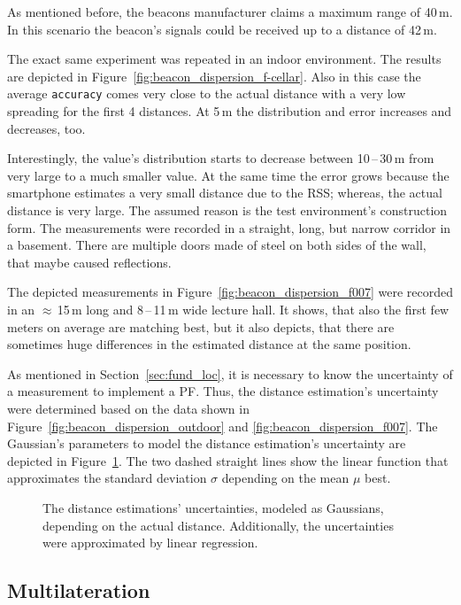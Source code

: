 As mentioned before, the beacons manufacturer claims a maximum range of 40\,m. In this scenario the beacon's signals could be received up to a distance of 42\,m.

The exact same experiment was repeated in an indoor environment. The results are depicted in Figure~\ref{fig:beacon_dispersion_f-cellar}. Also in this case the average \texttt{accuracy} comes very close to the actual distance with a very low spreading for the first 4 distances. At 5\,m the distribution and error increases and decreases, too.

Interestingly, the value's distribution starts to decrease between 10\,--\,30\,m from very large to a much smaller value. At the same time the error grows because the smartphone estimates a very small distance due to the \ac{RSS}; whereas, the actual distance is very large. The assumed reason is the test environment's construction form. The measurements were recorded in a straight, long, but narrow corridor in a basement. There are multiple doors made of steel on both sides of the wall, that maybe caused reflections.

The depicted measurements in Figure~\ref{fig:beacon_dispersion_f007} were recorded in an $\approx$\,15\,m long and 8\,--\,11\,m wide lecture hall. It shows, that also the first few meters on average are matching best, but it also depicts, that there are sometimes huge differences in the estimated distance at the same position.

As mentioned in Section~\ref{sec:fund_loc}, it is necessary to know the uncertainty of a measurement to implement a \acl{PF}. Thus, the distance estimation's uncertainty were determined based on the data shown in Figure~\ref{fig:beacon_dispersion_outdoor} and \ref{fig:beacon_dispersion_f007}. The Gaussian's parameters to model the distance estimation's uncertainty are depicted in Figure~\ref{fig:beacon_eval_ndf}. The two dashed straight lines show the linear function that approximates the standard deviation $\sigma$ depending on the mean $\mu$ best.

\begin{figure}
	
	\caption{The distance estimations' uncertainties, modeled as Gaussians, depending on the actual distance. Additionally, the uncertainties were approximated by linear regression.}
	\label{fig:beacon_eval_ndf}
\end{figure}


\subsection{Multilateration}

